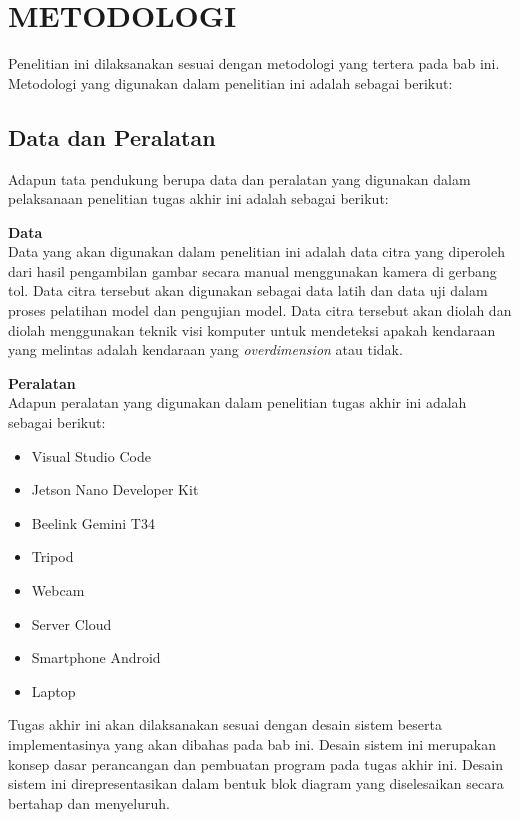 \chapter{METODOLOGI}
\label{chap:metodologi}


Penelitian ini dilaksanakan sesuai dengan metodologi yang tertera pada bab ini. Metodologi yang digunakan dalam penelitian ini adalah sebagai berikut:

\section{Data dan Peralatan}
Adapun tata pendukung berupa data dan peralatan yang digunakan dalam pelaksanaan penelitian tugas akhir ini adalah sebagai berikut:

\noindent \textbf{Data}\\
Data yang akan digunakan dalam penelitian ini adalah data citra yang diperoleh dari hasil pengambilan gambar secara manual menggunakan kamera di gerbang tol. Data citra tersebut akan digunakan sebagai data latih dan data uji dalam proses pelatihan model dan pengujian model. Data citra tersebut akan diolah dan diolah menggunakan teknik visi komputer untuk mendeteksi apakah kendaraan yang melintas adalah kendaraan yang \emph{overdimension} atau tidak.

\noindent \textbf{Peralatan}\\
Adapun peralatan yang digunakan dalam penelitian tugas akhir ini adalah sebagai berikut:

\begin{itemize}
  \item Visual Studio Code
  \item Jetson Nano Developer Kit
  \item Beelink Gemini T34 
  \item Tripod
  \item Webcam
  \item Server Cloud
  \item Smartphone Android
  \item Laptop
\end{itemize}

Tugas akhir ini akan dilaksanakan sesuai dengan desain sistem beserta implementasinya yang akan dibahas pada bab ini. Desain sistem ini merupakan konsep dasar perancangan dan pembuatan program pada tugas akhir ini. Desain sistem ini direpresentasikan dalam bentuk blok diagram yang diselesaikan secara bertahap dan menyeluruh.

